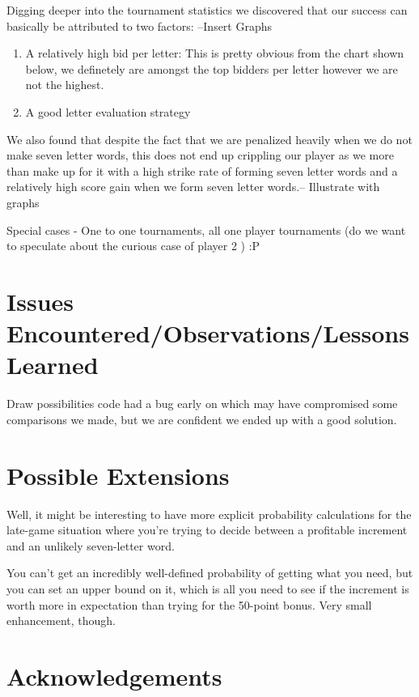\documentclass[11pt]{article}
\begin{document}
	Digging deeper into the tournament statistics we discovered that our success can basically be attributed to two factors:
	--Insert Graphs
	\begin{enumerate}
	\item{} A relatively high bid per letter: This is pretty obvious from the chart shown below, we definetely are amongst the top bidders per letter however we are not the highest.
	\item{} A good letter evaluation strategy
\end{enumerate}
	
	We also found that despite the fact that we are penalized heavily when we do not make seven letter words, this does not end up crippling our player as we more than make up for it with a high strike rate of forming seven letter words and a relatively high score gain when we form seven letter words.-- Illustrate with graphs
	
Special cases - One to one tournaments, all one player tournaments (do we want to speculate about the curious case of player 2 ) :P

\section{Issues Encountered/Observations/Lessons Learned}

Draw possibilities code had a bug early on which may have compromised some comparisons we made, but we are confident we ended up with a good solution.

\section{Possible Extensions}

Well, it might be interesting to have more explicit probability calculations for the late-game situation where you're trying to decide between a profitable increment and an unlikely seven-letter word.

You can't get an incredibly well-defined probability of getting what you need, but you can set an upper bound on it, which is all you need to see if the increment is worth more in expectation than trying for the 50-point bonus.  Very small enhancement, though.



\section{Acknowledgements}
\end{document}

